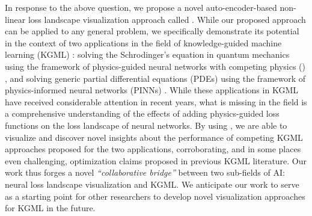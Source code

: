 \documentclass[letterpaper]{article} %
\begin{document}
                
                


                

            In response to the above question, we propose a novel auto-encoder-based non-linear loss landscape visualization approach called \proposedautencoder{}. While our proposed approach can be applied to any general problem, we specifically demonstrate its potential in the context of two applications in the field of knowledge-guided machine learning (KGML) \citep{tgds}: solving the Schrodinger's equation in quantum mechanics using the framework of physics-guided neural networks with competing physics (\cophy{}) \cite{elhamod2022cophy}, and solving generic partial differential equations (PDEs)  using the framework of physics-informed neural networks (PINNs) \cite{raissi2017physics1}. While  these applications in KGML have received considerable attention in recent years, what is missing in the field is a comprehensive understanding of the effects of adding physics-guided loss functions on the loss landscape of neural networks.
            By using \proposedautencoder{}, we are able to visualize and discover novel insights about the performance of competing KGML approaches proposed for the two applications, corroborating, and in some places even challenging, optimization claims proposed in previous KGML literature. Our work thus forges a novel \textit{``collaborative bridge''} between two sub-fields of AI: neural loss landscape visualization and KGML. We anticipate our work to serve as a starting point for other researchers to develop novel visualization approaches for KGML in the future.
            
\end{document}
